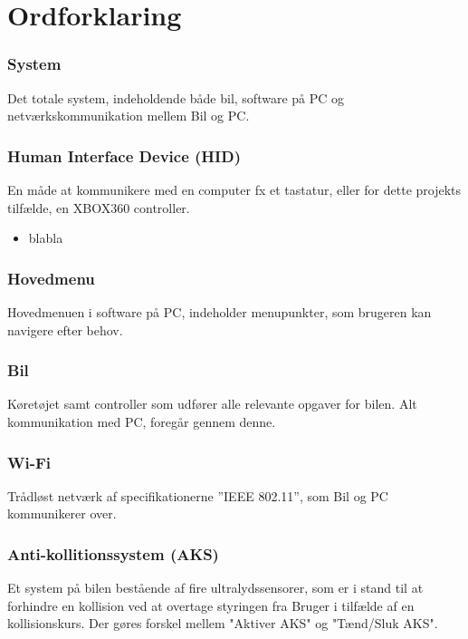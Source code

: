
\section{Ordforklaring}

\subsubsection{System}
Det totale system, indeholdende både bil, software på PC og netværkskommunikation mellem Bil og PC. 

\subsubsection{Human Interface Device (HID)}
En måde at kommunikere med en computer fx et tastatur, eller for dette projekts tilfælde, en XBOX360 controller.

\begin{itemize}
	\item blabla
\end{itemize}

\subsubsection{Hovedmenu}
Hovedmenuen i software på PC, indeholder menupunkter, som brugeren kan navigere efter behov.

\subsubsection{Bil}
Køretøjet samt controller som udfører alle relevante opgaver for bilen. Alt kommunikation med PC, foregår gennem denne.

\subsubsection{Wi-Fi}
Trådløst netværk af specifikationerne ''IEEE 802.11'', som Bil og PC kommunikerer over.

\subsubsection{Anti-kollitionssystem (AKS)}
Et system på bilen bestående af fire ultralydssensorer, som er i stand til at forhindre en kollision ved at overtage styringen fra Bruger i tilfælde af en kollisionskurs. Der gøres forskel mellem "Aktiver AKS" og "Tænd/Sluk AKS".

